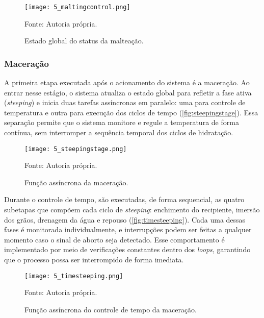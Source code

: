 \begin{figure}[ht]
    \centering
    \caption{Estado global do status da malteação.}
    \label{fig:maltingcontrol}
    \texttt{[image: 5\_maltingcontrol.png]}

    {\centering\footnotesize Fonte: Autoria própria.\par}
\end{figure}

\subsubsection{Maceração}

A primeira etapa executada após o acionamento do sistema é a maceração. Ao entrar nesse estágio, o sistema atualiza o estado global para refletir a fase ativa (\textit{steeping}) e inicia duas tarefas assíncronas em paralelo: uma para controle de temperatura e outra para execução dos ciclos de tempo (\autoref{fig:steepingstage}). Essa separação permite que o sistema monitore e regule a temperatura de forma contínua, sem interromper a sequência temporal dos ciclos de hidratação.

\begin{figure}[ht]
    \centering
    \caption{Função assíncrona da maceração.}
    \label{fig:steepingstage}
    \texttt{[image: 5\_steepingstage.png]}

    {\centering\footnotesize Fonte: Autoria própria.\par}
\end{figure}

Durante o controle de tempo, são executadas, de forma sequencial, as quatro subetapas que compõem cada ciclo de \textit{steeping}: enchimento do recipiente, imersão dos grãos, drenagem da água e repouso (\autoref{fig:timesteeping}). Cada uma dessas fases é monitorada individualmente, e interrupções podem ser feitas a qualquer momento caso o sinal de aborto seja detectado. Esse comportamento é implementado por meio de verificações constantes dentro dos \textit{loops}, garantindo que o processo possa ser interrompido de forma imediata.

\begin{figure}[ht]
    \centering
    \caption{Função assíncrona do controle de tempo da maceração.}
    \label{fig:timesteeping}
    \texttt{[image: 5\_timesteeping.png]}

    {\centering\footnotesize Fonte: Autoria própria.\par}
\end{figure}

